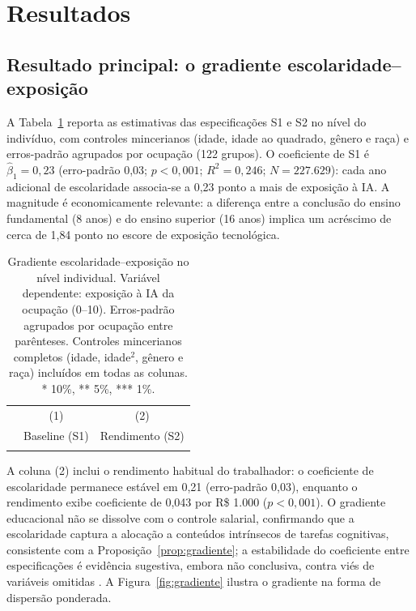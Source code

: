 \section{Resultados}
\label{sec:resultados}

\subsection{Resultado principal: o gradiente escolaridade--exposição}

A Tabela~\ref{tab:gradiente} reporta as estimativas das especificações S1 e S2 no nível do indivíduo, com controles mincerianos (idade, idade ao quadrado, gênero e raça) e erros-padrão agrupados por ocupação (122 grupos). O coeficiente de S1 é $\hat{\beta}_1 = 0{,}23$ (erro-padrão 0{,}03; $p < 0{,}001$; $R^2 = 0{,}246$; $N = 227.629$): cada ano adicional de escolaridade associa-se a 0{,}23 ponto a mais de exposição à IA. A magnitude é economicamente relevante: a diferença entre a conclusão do ensino fundamental (8 anos) e do ensino superior (16 anos) implica um acréscimo de cerca de 1{,}84 ponto no escore de exposição tecnológica.

\begin{table}[htbp]
\centering
\caption{Gradiente escolaridade--exposição no nível individual. Variável dependente: exposição à IA da ocupação (0--10). Erros-padrão agrupados por ocupação entre parênteses. Controles mincerianos completos (idade, idade$^2$, gênero e raça) incluídos em todas as colunas. * 10\%, ** 5\%, *** 1\%.}
\label{tab:gradiente}
\begin{tabular}{lcc}
\toprule
 & (1) & (2) \\
 & Baseline (S1) & Rendimento (S2) \\
\midrule
 \\
\bottomrule
\end{tabular}
\end{table}

A coluna (2) inclui o rendimento habitual do trabalhador: o coeficiente de escolaridade permanece estável em 0{,}21 (erro-padrão 0{,}03), enquanto o rendimento exibe coeficiente de 0{,}043 por R\$ 1.000 ($p < 0{,}001$). O gradiente educacional não se dissolve com o controle salarial, confirmando que a escolaridade captura a alocação a conteúdos intrínsecos de tarefas cognitivas, consistente com a Proposição~\ref{prop:gradiente}; a estabilidade do coeficiente entre especificações é evidência sugestiva, embora não conclusiva, contra viés de variáveis omitidas \citep{oster2019unobservable}. A Figura~\ref{fig:gradiente} ilustra o gradiente na forma de dispersão ponderada.

